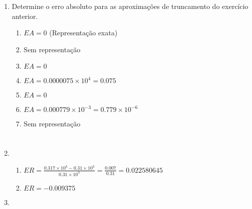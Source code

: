 \documentclass[a4paper]{article}
\begin{document}
\begin{enumerate}
\item Determine o erro absoluto para as aproximações de truncamento do
  exercício anterior.
  \begin{enumerate}
  \item $EA = 0$ (Representação exata) %
  \item Sem representação%
  \item $EA = 0$ %
  \item $EA = 0.0000075 \times 10^4 = 0.075$ %
  \item $EA = 0$ %
  \item $EA = 0.000779 \times 10^{-3} = 0.779 \times 10^{-6}$ %
  \item Sem representação %
  \end{enumerate}



  \section{}




\item
  \begin{enumerate}
  \item $ER = \frac{0.317 \times 10^3 - 0.31 \times 10^3}{0.31 \times
      10^3} = \frac{0.007}{0.31} = 0.022580645$
  \item $ER = -0.009375$
  \end{enumerate}

\item %

\end{enumerate}
\end{document}
